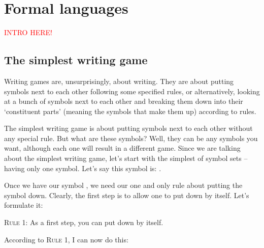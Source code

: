 \chapter{Formal languages}

\textcolor{red}{INTRO HERE!}

\section{The simplest writing game}

Writing games are, unsurprisingly, about writing. They are about putting symbols next to each other following some specified rules, or alternatively, looking at a bunch of symbols next to each other and breaking them down into their `constituent parts' (meaning the symbols that make them up) according to rules. 

The simplest writing game is about putting symbols next to each other without any special rule. But what are these symbols? Well, they can be any symbols you want, although each one will result in a different game. Since we are talking about the simplest writing game, let's start with the simplest of symbol sets -- having only one symbol. Let's say this symbol is: \bcirc{}.

\begin{center}
\end{center}

Once we have our symbol \bcirc{}, we need our one and only rule about putting the symbol down. Clearly, the first step is to allow one to put down \bcirc{} by itself. Let's formulate it: 

\textsc{Rule 1:} As a first step, you can put down \bcirc{} by itself. 

According to \textsc{Rule 1}, I can now do this:

\begin{center}
	\bcirc{}
\end{center}

